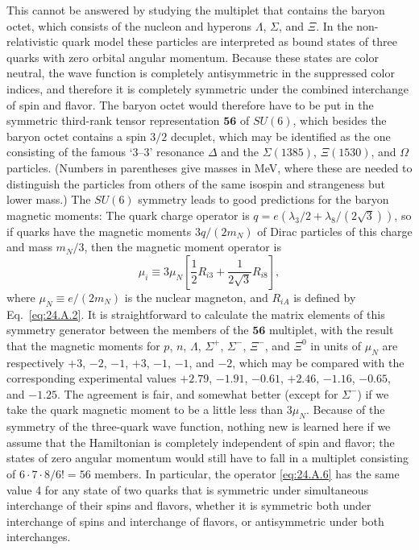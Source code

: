 This cannot be answered by studying the multiplet that contains the baryon
octet, which consists of the nucleon and hyperons $\Lambda$, $\Sigma$, and
$\Xi$. In the non-relativistic quark model these particles are interpreted as
bound states of three quarks with zero orbital angular momentum. Because these
states are color neutral, the wave function is completely antisymmetric in the
suppressed color indices, and therefore it is completely symmetric under the
combined interchange of spin and flavor. The baryon octet would therefore have
to be put in the symmetric third-rank tensor representation $\mathbf{56}$ of
$SU(6)$, which besides the baryon octet contains a spin $3/2$ decuplet, which
may be identified as the one consisting of the famous `3--3' resonance
$\Delta$ and the $\Sigma(1385)$, $\Xi(1530)$, and $\Omega$ particles. (Numbers
in parentheses give masses in MeV, where these are needed to distinguish the
particles from others of the same isospin and strangeness but lower mass.) The
$SU(6)$ symmetry leads to good predictions for the baryon magnetic moments:
The quark charge operator is
$q=e(\lambda_3/2+\lambda_8/(2\sqrt{3}))$, so if quarks have the magnetic
moments $3q/(2m_N)$ of Dirac particles of this charge and mass $m_N/3$, then
the magnetic moment operator is
\[
 \mu_i\equiv 3\mu_N
 \left[\frac{1}{2}R_{i3}+\frac{1}{2\sqrt{3}}R_{i8}\right],
\]
where $\mu_N\equiv e/(2m_N)$ is the nuclear magneton, and $R_{iA}$ is defined
by Eq.~\eqref{eq:24.A.2}. It is straightforward to calculate the matrix
elements of this symmetry generator between the members of the $\mathbf{56}$
multiplet, with the result that the magnetic moments for $p$, $n$, $\Lambda$,
$\Sigma^+$, $\Sigma^-$, $\Xi^-$, and $\Xi^0$ in units of $\mu_N$ are
respectively $+3$, $-2$, $-1$, $+3$, $-1$, $-1$, and $-2$, which may be
compared with the corresponding experimental values $+2.79$, $-1.91$, $-0.61$,
$+2.46$, $-1.16$, $-0.65$, and $-1.25$. The agreement is fair, and somewhat
better (except for $\Sigma^-$) if we take the quark magnetic moment to be a
little less than $3\mu_N$. Because of the symmetry of the three-quark wave
function, nothing new is learned here if we assume that the Hamiltonian is
completely independent of spin and flavor; the states of zero angular momentum
would still have to fall in a multiplet consisting of
$6\cdot7\cdot8/6!=56$ members. In particular, the operator
\eqref{eq:24.A.6} has the same value 4 for any state of two quarks that is
symmetric under simultaneous interchange of their spins and flavors, whether
it is symmetric both under interchange of spins and interchange of flavors, or
antisymmetric under both interchanges.

